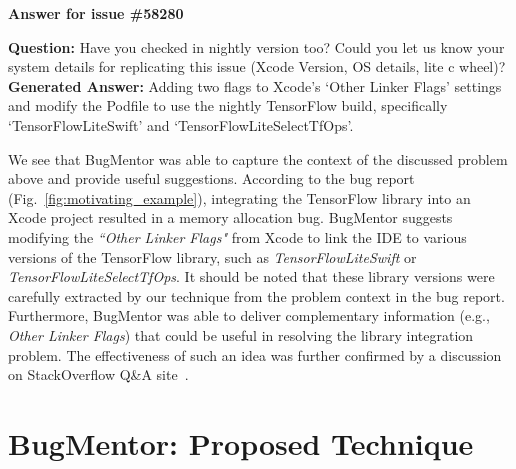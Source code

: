 \begin{frshaded}
    \begin{center}
        \textbf{Answer for issue \#58280 }
    \end{center}
        \noindent
        \textbf{Question:} Have you checked in nightly version too? Could you let us know your system details for replicating this issue (Xcode Version, OS details, lite c wheel)?\\
        \textbf{Generated Answer: }Adding two flags to Xcode's `Other Linker Flags' settings and modify the Podfile to use the nightly TensorFlow build, specifically `TensorFlowLiteSwift' and `TensorFlowLiteSelectTfOps'.
\end{frshaded}

We see that BugMentor was able to capture the context of the discussed problem above and provide useful suggestions. According to the bug report (Fig.~\ref{fig:motivating_example}), integrating the TensorFlow library into an Xcode project resulted in a memory allocation bug. BugMentor suggests modifying the \textit{``Other Linker Flags"} from Xcode to link the IDE to various versions of the TensorFlow library, such as \textit{TensorFlowLiteSwift} or \textit{TensorFlowLiteSelectTfOps}. It should be noted that these library versions were carefully extracted by our technique from the problem context in the bug report. Furthermore, BugMentor was able to deliver complementary information (e.g., \textit{Other Linker Flags}) that could be useful in resolving the library integration problem. The effectiveness of such an idea was further confirmed by a discussion on StackOverflow Q\&A site~\cite{linkerflags}.



\section{BugMentor: Proposed Technique} \label{Chap1:BugMentor}


